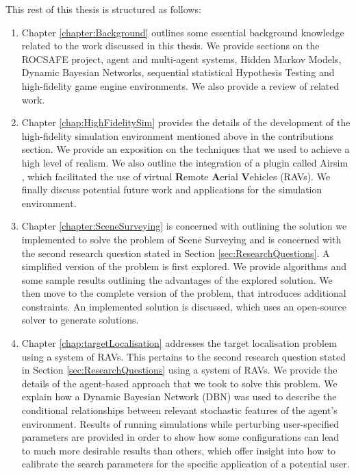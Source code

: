 This rest of this thesis is structured as follows: 
\begin{enumerate}
    \item Chapter \ref{chapter:Background} outlines some essential background knowledge related to the work discussed in this thesis. We provide sections on the ROCSAFE project, agent and multi-agent systems, Hidden Markov Models, Dynamic Bayesian Networks, sequential statistical Hypothesis Testing and high-fidelity game engine environments. We also provide a review of related work.
    \item Chapter \ref{chap:HighFidelitySim} provides the details of the development of the high-fidelity simulation environment mentioned above in the contributions section. We provide an exposition on the techniques that we used to achieve a high level of realism. We also outline the integration of a plugin called Airsim \cite{Shah2017AirSim:Vehicles}, which facilitated the use of virtual \textbf{R}emote \textbf{A}erial \textbf{V}ehicles (RAVs). We finally discuss potential future work and applications for the simulation environment.
    \item Chapter \ref{chapter:SceneSurveying} is concerned with outlining the solution we implemented to solve the problem of Scene Surveying and is concerned with the second research question stated in Section \ref{sec:ResearchQuestions}. A simplified version of the problem is first explored. We provide algorithms and some sample results outlining the advantages of the explored solution. We then move to the complete version of the problem, that introduces additional constraints. An implemented solution is discussed, which uses an open-source solver to generate solutions. 
    \item Chapter \ref{chap:targetLocalisation} addresses the target localisation problem using a system of RAVs. This pertains to the second research question stated in Section \ref{sec:ResearchQuestions} using a system of RAVs. We provide the details of the agent-based approach that we took to solve this problem. We explain how a Dynamic Bayesian Network (DBN) was used to describe the conditional relationships between relevant stochastic features of the agent's environment. Results of running simulations while perturbing user-specified parameters are provided in order to show how some configurations can lead to much more desirable results than others, which offer insight into how to calibrate the search parameters for the specific application of a potential user.
    
\end{enumerate}